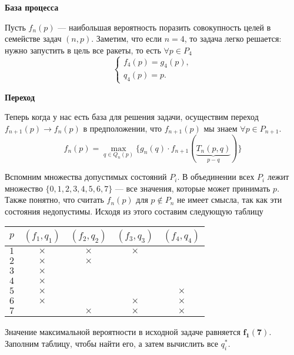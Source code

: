 \bigskip

\textbf{База процесса}

Пусть $f_n(p)$ --- наибольшая вероятность поразить совокупность целей в семействе задач $(n, p)$. Заметим, что если $n = 4$, то задача легко решается: нужно запустить в цель все ракеты, то есть $\forall p \in P_4$
\[
\begin{cases}
	f_4(p) = g_4(p), \\
	q_4(p) = p.
\end{cases}
\]

\bigskip

\textbf{Переход}

Теперь когда у нас есть база для решения задачи, осуществим переход $f_{n+1}(p) \to f_n(p)$ в предположении, что $f_{n+1}(p)$ мы знаем $\forall p \in P_{n + 1}$.
\[
\boxed{f_n(p) = \max_{q \in Q_n(p)} \Big\{ g_n(q) \cdot f_{n + 1}(\underbrace{T_n(p, q)}_{p - q}) \Big\}}\tag{**}
\]

Вспомним множества допустимых состояний $P_i$. В объединении всех $P_i$ лежит множество $\{0, 1, 2, 3, 4, 5, 6, 7\}$ --- все значения, которые может принимать $p$. Также понятно, что считать $f_n(p)$ для $p \notin P_n$ не имеет смысла, так как эти состояния недопустимы. Исходя из этого составим следующую таблицу

\begin{table}[H]
	\centering
	\begin{tabular}{ | c | c | c | c | c | } 
		\hline
		$p$ & $(f_1, q_1)$ & $(f_2, q_2)$ & $(f_3, q_3)$ & $(f_4, q_4)$ \\ 
		\hline
		$1$ & $\times$ & $\times$ & $\times$ & \\\hline
		$2$ & $\times$ & $\times$ & & \\\hline
		$3$ & $\times$ & & & \\\hline
		$4$ & $\times$ & & & \\\hline
		$5$ & $\times$ & & & $\times$ \\\hline
		$6$ & $\times$ & & $\times$ & $\times$ \\\hline
		$7$ & & $\times$ & $\times$ & $\times$ \\\hline
	\end{tabular}
\end{table}

Значение максимальной вероятности в исходной задаче равняется $\mathbf {f_1(7)}$. Заполним таблицу, чтобы найти его, а затем вычислить все $q^*_i$.

\bigskip

